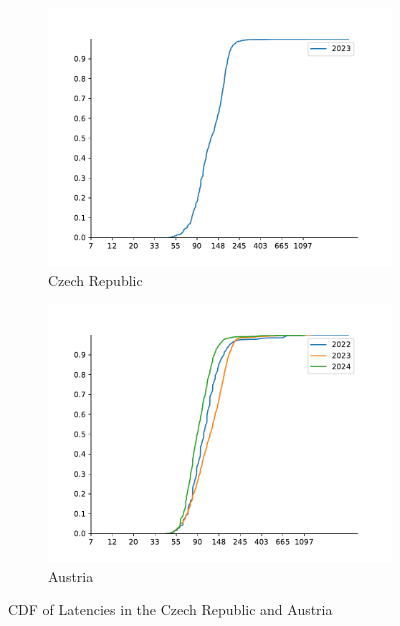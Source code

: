 \begin{figure}
	\centering
	\begin{subfigure}[b]{0.8\linewidth}
		\includegraphics[width=\linewidth]{chapters/4-results/latency/img/cdf_latencies_of_starlink_probes_in_czechia.pdf}
		\caption{Czech Republic}
	\end{subfigure}
	\begin{subfigure}[b]{0.8\linewidth}
		\includegraphics[width=\linewidth]{chapters/4-results/latency/img/cdf_latencies_of_starlink_probes_in_austria.pdf}
		\caption{Austria}
	\end{subfigure}
	\caption{CDF of Latencies in the Czech Republic and Austria}
	\label{fig:latency-cdf-6}
\end{figure}

